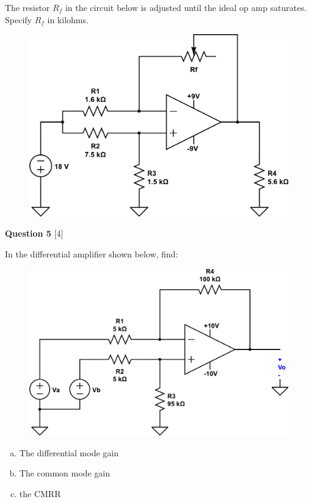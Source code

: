 \documentclass[12pt]{article}
\begin{document}
The resistor $R_f$ in the circuit below is adjusted until the ideal op amp saturates. Specify $R_f$ in kilohms.

\begin{figure}[h!]
\begin{center}
 \includegraphics[scale=0.4]{p5_26.png}
\end{center}
\end{figure}

\newpage

{\bf Question 5} [4] %

In the differential amplifier shown below, find:

\begin{figure}[h!]
\begin{center}
 \includegraphics[scale=0.4]{p5_32.png}
\end{center}
\end{figure}

\begin{enumerate}[(a)]
\item The differential mode gain
\item The common mode gain
\item the CMRR
\end{enumerate}
\end{document}
